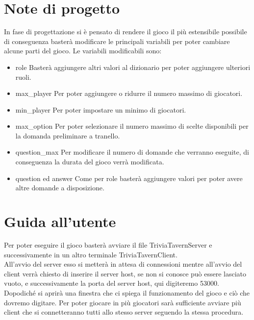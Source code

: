 \documentclass[a4paper,12pt]{report}
\begin{document}
\chapter{Note di progetto}
    In fase di progettazione si è pensato di rendere il gioco il più estensibile possibile di conseguenza basterà modificare le principali variabili per poter cambiare alcune parti del gioco.
    Le variabili modificabili sono:
    \begin{itemize}
        \item role Basterà aggiungere altri valori al dizionario per poter aggiungere ulteriori ruoli.
        \item max\_player Per poter aggiungere o ridurre il numero massimo di giocatori.
        \item min\_player Per poter impostare un minimo di giocatori.
        \item max\_option Per poter selezionare il numero massimo di scelte disponibili per la domanda preliminare a tranello.
        \item question\_max Per modificare il numero di domande che verranno eseguite, di conseguenza la durata del gioco verrà modificata.
        \item question ed answer Come per role basterà aggiungere valori per poter avere altre domande a disposizione.
    \end{itemize}

\chapter{Guida all'utente}
    Per poter eseguire il gioco basterà avviare il file TriviaTavernServer e successivamente in un altro terminale TriviaTavernClient. \\
    All'avvio del server esso si metterà in attesa di connessioni mentre all'avvio del client verrà chiesto di inserire il server host, se non si conosce può essere lasciato vuoto, e successivamente la porta del server host, qui digiteremo 53000. \\
    Dopodiché si aprirà una finestra che ci spiega il funzionamento del gioco e ciò che dovremo digitare. Per poter giocare in più giocatori sarà sufficiente avviare più client che si connetteranno tutti allo stesso server seguendo la stessa procedura.
    
\end{document}
